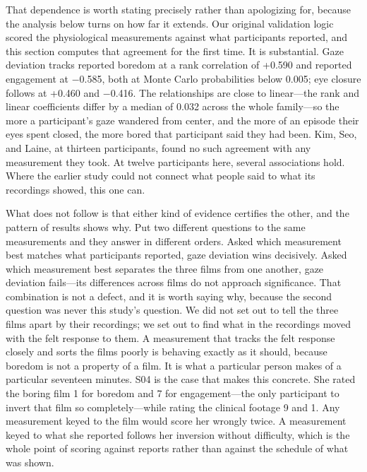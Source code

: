 That dependence is worth stating precisely rather than apologizing for, because the analysis
below turns on how far it extends. Our original validation logic scored the physiological
measurements against what participants reported, and this section computes that agreement for
the first time. It is substantial. Gaze deviation tracks reported boredom at a rank correlation
of +0.590 and reported engagement at $-$0.585, both at Monte Carlo probabilities below 0.005;
eye closure follows at +0.460 and $-$0.416. The relationships are close to linear---the rank and
linear coefficients differ by a median of 0.032 across the whole family---so the more a
participant's gaze wandered from center, and the more of an episode their eyes spent closed, the
more bored that participant said they had been. Kim, Seo, and Laine, at thirteen participants,
found no such agreement with any measurement they took. At twelve participants here, several
associations hold. Where the earlier study could not connect what people said to what its
recordings showed, this one can.

What does not follow is that either kind of evidence certifies the other, and the pattern of
results shows why. Put two different questions to the same measurements and they answer in
different orders. Asked which measurement best matches what participants reported, gaze
deviation wins decisively. Asked which measurement best separates the three films from one
another, gaze deviation fails---its differences across films do not approach significance.
That combination is not a defect, and it is worth saying why, because the second question was
never this study's question. We did not set out to tell the three films apart by their
recordings; we set out to find what in the recordings moved with the felt response to them. A
measurement that tracks the felt response closely and sorts the films poorly is behaving
exactly as it should, because boredom is not a property of a film. It is what a particular
person makes of a particular seventeen minutes. S04 is the case that makes this concrete. She
rated the boring film 1 for boredom and 7 for engagement---the only participant to invert that
film so completely---while rating the clinical footage 9 and 1. Any measurement keyed to the
film would score her wrongly twice. A measurement keyed to what she reported follows her
inversion without difficulty, which is the whole point of scoring against reports rather than
against the schedule of what was shown.

